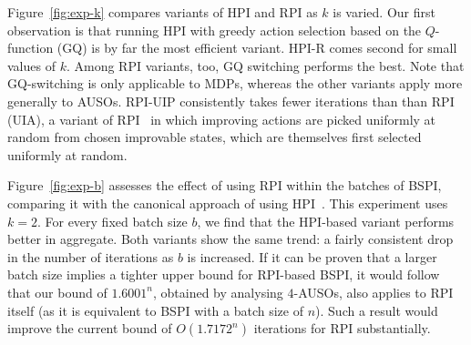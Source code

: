 Figure~\ref{fig:exp-k} compares variants of HPI and RPI as $k$ is varied. Our first observation is that running HPI with greedy action selection based on the $Q$-function (GQ) is by far the most efficient variant.  HPI-R comes second for small values of $k$. Among RPI variants, too, GQ switching performs the best. Note that GQ-switching is only applicable to MDPs, whereas the other variants apply more generally to AUSOs. RPI-UIP consistently takes fewer iterations than than RPI (UIA), a variant of RPI~\cite{Mansour+Singh:1999} in which improving actions are picked uniformly at random from chosen improvable states, which are themselves first selected uniformly at random.

Figure~\ref{fig:exp-b} assesses the effect of using RPI within the batches of BSPI, comparing it with the canonical approach of using HPI~\cite{Kalyanakrishnan+MG-bspi:2016}. This experiment uses $k = 2$. For every fixed batch size $b$, we find that the HPI-based variant performs better in aggregate. Both variants show the same trend: a fairly consistent drop in the number of iterations as $b$ is increased. If it can be proven that a larger batch size implies a tighter upper bound for RPI-based BSPI, it would follow that our bound of $1.6001^{n}$, obtained by analysing $4$-AUSOs, also applies to RPI itself (as it is equivalent to BSPI with a batch size of $n$). Such a result would improve the current bound of $O(1.7172^{n})$ iterations for RPI substantially.

